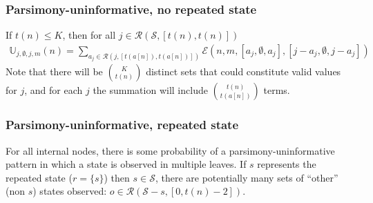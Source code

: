 \documentclass[11pt]{article}
\newcommand{\numStates}{\ensuremath{K}\xspace}
\newcommand{\allStates}{\ensuremath{\mathcal S}\xspace}
\newcommand{\probUninformPatClassSym}{\ensuremath{\mathbb U}\xspace}
\newcommand{\probUninformPatClass}[5]{\ensuremath{\probUninformPatClassSym_{#1,#2,#3,#4}\left(#5\right)}\xspace}
\newcommand{\leftChild}[1]{\ensuremath{a\left[#1\right]}\xspace} %
\newcommand{\numLeaves}[1]{\ensuremath{t\left(#1\right)}\xspace}
\newcommand{\subsetsOfSizeSet}[3]{\ensuremath{\mathcal R}\left(#1,\left[#2,#3\right]\right)\xspace}
\newcommand{\DoubleFelsensteinPruneSym}{{\mathcal{E}}}
\newcommand{\DoubleFelsensteinPruneUninform}[8]{\DoubleFelsensteinPruneSym(#1,#2,\left[#3,#4,#5\right],\left[#6,#7,#8\right])}
\begin{document}
\subsubsection{Parsimony-uninformative, no repeated state}
If $\numLeaves{n}\leq\numStates$, then for all $j\in\subsetsOfSizeSet{\allStates}{\numLeaves{n}}{\numLeaves{n}}$
\begin{eqnarray}
\probUninformPatClass{j}{\emptyset}{j}{m}{n}= \sum_{a_j\in\subsetsOfSizeSet{j}{\numLeaves{\leftChild{n}}}{\numLeaves{\leftChild{n}}}}\DoubleFelsensteinPruneUninform{n}{m}{a_j}{\emptyset}{a_j}{j-a_j}{\emptyset}{j-a_j}
\end{eqnarray}
Note that there will be $\numStates\choose\numLeaves{n}$ distinct sets that could constitute valid values for $j$, and for each $j$ the summation will include $\numLeaves{n}\choose\numLeaves{\leftChild{n}}$ terms.



\subsubsection{Parsimony-uninformative, repeated state}
For all internal nodes, there is some probability of a parsimony-uninformative pattern in which a state is observed in multiple leaves.
If $s$ represents the repeated state ($r=\{s\}$) then $s\in \allStates$, there are potentially many sets of ``other'' (non $s$) states observed: $o\in\subsetsOfSizeSet{\allStates-s}{0}{\numLeaves{n}-2}$.
\end{document}
